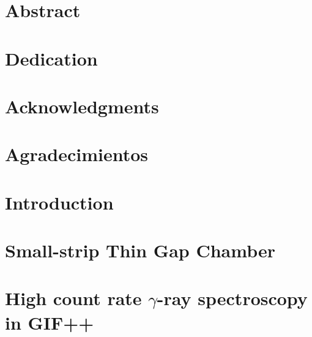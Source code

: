 








\chapter*{Abstract}



\chapter*{Dedication}


\chapter*{Acknowledgments}
\chapter*{Agradecimientos}


\tableofcontents




\chapter{Introduction}



\chapter{Small-strip Thin Gap Chamber}



\chapter{High count rate $\gamma$-ray spectroscopy in GIF++}\label{spectrum}
%


